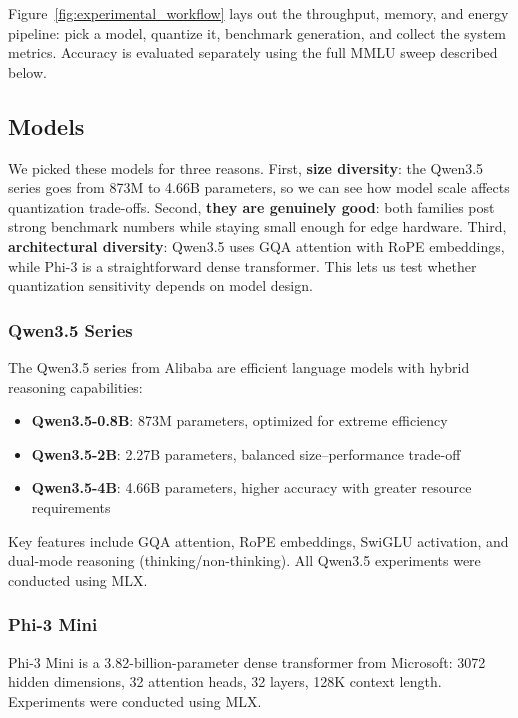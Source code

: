 \documentclass[11pt,a4paper]{article}
\begin{document}
Figure~\ref{fig:experimental_workflow} lays out the throughput, memory, and energy pipeline: pick a model, quantize it, benchmark generation, and collect the system metrics. Accuracy is evaluated separately using the full MMLU sweep described below.

\subsection{Models}

We picked these models for three reasons. First, \textbf{size diversity}: the Qwen3.5 series goes from 873M to 4.66B parameters, so we can see how model scale affects quantization trade-offs. Second, \textbf{they are genuinely good}: both families post strong benchmark numbers while staying small enough for edge hardware. Third, \textbf{architectural diversity}: Qwen3.5 uses GQA attention with RoPE embeddings, while Phi-3 is a straightforward dense transformer. This lets us test whether quantization sensitivity depends on model design.

\subsubsection{Qwen3.5 Series}

The Qwen3.5 series \cite{qwen2025technical} from Alibaba are efficient language models with hybrid reasoning capabilities:

\begin{itemize}[leftmargin=*,nosep]
    \item \textbf{Qwen3.5-0.8B}: 873M parameters, optimized for extreme efficiency
    \item \textbf{Qwen3.5-2B}: 2.27B parameters, balanced size--performance trade-off
    \item \textbf{Qwen3.5-4B}: 4.66B parameters, higher accuracy with greater resource requirements
\end{itemize}

Key features include GQA attention, RoPE embeddings, SwiGLU activation, and dual-mode reasoning (thinking/non-thinking). All Qwen3.5 experiments were conducted using MLX.

\subsubsection{Phi-3 Mini}

Phi-3 Mini \cite{abdin2024phi3} is a 3.82-billion-parameter dense transformer from Microsoft: 3072 hidden dimensions, 32 attention heads, 32 layers, 128K context length. Experiments were conducted using MLX.
\end{document}
